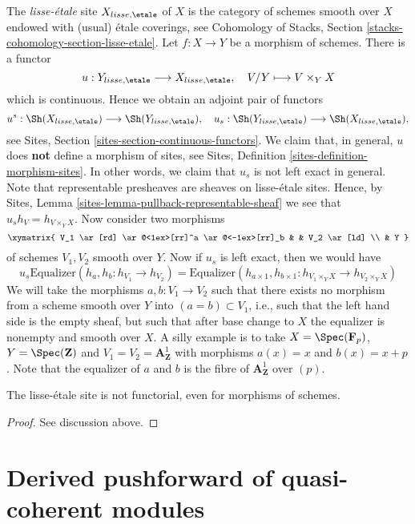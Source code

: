 \noindent
The {\it lisse-\'etale} site
$X_{lisse,\etale}$ of $X$ is the category of schemes smooth over $X$
endowed with (usual) \'etale coverings, see
Cohomology of Stacks, Section \ref{stacks-cohomology-section-lisse-etale}.
Let $f : X  \to Y$ be a morphism of schemes.
There is a functor
$$
u : Y_{lisse,\etale} \longrightarrow X_{lisse,\etale},\quad
V/Y \longmapsto V \times_Y X
$$
which is continuous. Hence we obtain an adjoint pair of functors
$$
u^s :
\Sh(X_{lisse,\etale})
\longrightarrow
\Sh(Y_{lisse,\etale}),
\quad
u_s :
\Sh(Y_{lisse,\etale})
\longrightarrow
\Sh(X_{lisse,\etale}),
$$
see Sites, Section \ref{sites-section-continuous-functors}.
We claim that, in general, $u$ does {\bf not} define a morphism of sites, see
Sites, Definition \ref{sites-definition-morphism-sites}.
In other words, we claim that $u_s$ is not left exact in general. Note that
representable presheaves are sheaves on lisse-\'etale sites. Hence, by
Sites, Lemma \ref{sites-lemma-pullback-representable-sheaf}
we see that $u_sh_V = h_{V \times_Y X}$. Now consider two morphisms
$$
\xymatrix{
V_1 \ar[rd] \ar@<1ex>[rr]^a \ar@<-1ex>[rr]_b & & V_2 \ar[ld] \\
& Y
}
$$
of schemes $V_1, V_2$ smooth over $Y$. Now if $u_s$ is left exact, then
we would have
$$
u_s \text{Equalizer}(h_a, h_b : h_{V_1} \to h_{V_2})
=
\text{Equalizer}(h_{a \times 1}, h_{b \times 1} :
h_{V_1 \times_Y X} \to h_{V_2 \times_Y X})
$$
We will take the morphisms $a, b : V_1 \to V_2$ such that there exists
no morphism from a scheme smooth over $Y$ into $(a = b) \subset V_1$, i.e.,
such that the left hand side is the empty sheaf, but such that after
base change to $X$ the equalizer is nonempty and smooth over $X$.
A silly example is to take $X = \Spec(\mathbf{F}_p)$,
$Y = \Spec(\mathbf{Z})$ and $V_1 = V_2 = \mathbf{A}^1_\mathbf{Z}$
with morphisms $a(x) = x$ and $b(x) = x + p$. Note that the equalizer
of $a$ and $b$ is the fibre of $\mathbf{A}^1_\mathbf{Z}$ over $(p)$.

\begin{lemma}
\label{lemma-lisse-etale-not-functorial}
The lisse-\'etale site is not functorial, even for morphisms of schemes.
\end{lemma}

\begin{proof}
See discussion above.
\end{proof}





\section{Derived pushforward of quasi-coherent modules}
\label{section-derived-push-quasi-coherent}

